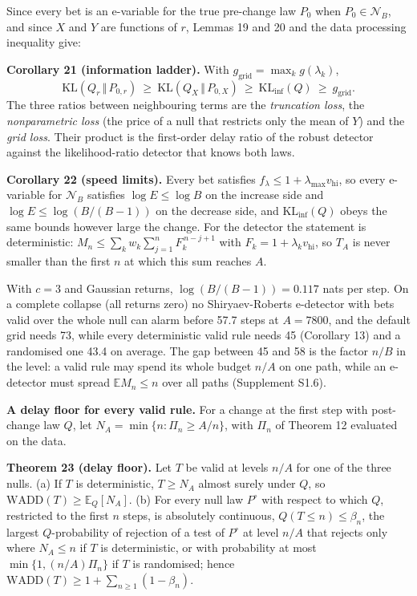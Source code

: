 \documentclass[
]{article}
\begin{document}
Since every bet is an e-variable for the true pre-change law \(P_0\)
when \(P_0 \in \mathcal{N}_B\), and since \(X\) and \(Y\) are functions
of \(r\), Lemmas 19 and 20 and the data processing inequality give:

\textbf{Corollary 21 (information ladder).} With
\(g_{\mathrm{grid}} = \max_k g(\lambda_k)\), \[
\mathrm{KL}(Q_r \,\Vert\, P_{0,r}) \ \ge\ \mathrm{KL}(Q_X \,\Vert\, P_{0,X}) \ \ge\ \mathrm{KL}_{\inf}(Q) \ \ge\ g_{\mathrm{grid}}.
\] The three ratios between neighbouring terms are the \emph{truncation
loss}, the \emph{nonparametric loss} (the price of a null that restricts
only the mean of \(Y\)) and the \emph{grid loss}. Their product is the
first-order delay ratio of the robust detector against the
likelihood-ratio detector that knows both laws.

\textbf{Corollary 22 (speed limits).} Every bet satisfies
\(f_\lambda \le 1 + \lambda_{\max} v_{\mathrm{hi}}\), so every
e-variable for \(\mathcal{N}_B\) satisfies \(\log E \le \log B\) on the
increase side and \(\log E \le \log(B/(B-1))\) on the decrease side, and
\(\mathrm{KL}_{\inf}(Q)\) obeys the same bounds however large the
change. For the detector the statement is deterministic:
\(M_n \le \sum_k w_k \sum_{j=1}^{n} F_k^{\,n-j+1}\) with
\(F_k = 1 + \lambda_k v_{\mathrm{hi}}\), so \(T_A\) is never smaller
than the first \(n\) at which this sum reaches \(A\).

With \(c = 3\) and Gaussian returns, \(\log(B/(B-1)) = 0.117\) nats per
step. On a complete collapse (all returns zero) no Shiryaev-Roberts
e-detector with bets valid over the whole null can alarm before 57.7
steps at \(A = 7800\), and the default grid needs 73, while every
deterministic valid rule needs 45 (Corollary 13) and a randomised one
43.4 on average. The gap between 45 and 58 is the factor \(n/B\) in the
level: a valid rule may spend its whole budget \(n/A\) on one path,
while an e-detector must spread \(\mathbb{E} M_n \le n\) over all paths
(Supplement S1.6).

\textbf{A delay floor for every valid rule.} For a change at the first
step with post-change law \(Q\), let
\(N_A = \min\lbrace n : \Pi_n \ge A/n\rbrace\), with \(\Pi_n\) of
Theorem 12 evaluated on the data.

\textbf{Theorem 23 (delay floor).} Let \(T\) be valid at levels \(n/A\)
for one of the three nulls. (a) If \(T\) is deterministic, \(T \ge N_A\)
almost surely under \(Q\), so
\(\mathrm{WADD}(T) \ge \mathbb{E}_Q[N_A]\). (b) For every null law
\(P^\circ\) with respect to which \(Q\), restricted to the first \(n\)
steps, is absolutely continuous, \(Q(T \le n) \le \beta_n\), the largest
\(Q\)-probability of rejection of a test of \(P^\circ\) at level \(n/A\)
that rejects only where \(N_A \le n\) if \(T\) is deterministic, or with
probability at most \(\min\lbrace 1, (n/A)\Pi_n\rbrace\) if \(T\) is
randomised; hence
\(\mathrm{WADD}(T) \ge 1 + \sum_{n \ge 1}(1 - \beta_n)\).
\end{document}
